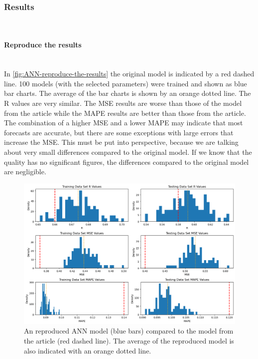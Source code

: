 \documentclass{article}
\newcommand{\subsubsubsection}[1]{%
  \paragraph{#1}\mbox{}\\}
\begin{document}
\subsubsection{Results}

\subsubsubsection{Reproduce the results}

In \autoref{fig:ANN-reproduce-the-results} the original model is indicated by a red dashed line. 100 models (with the selected parameters) were trained and shown as blue bar charts. The average of the bar charts is shown by an orange dotted line.
The R values are very similar. The MSE results are worse than those of the model from the article while the MAPE results are better than those from the article.
The combination of a higher MSE and a lower MAPE may indicate that most forecasts are accurate, but there are some exceptions with large errors that increase the MSE.
This must be put into perspective, because we are talking about very small differences compared to the original model. If we know that the quality has no significant figures, the differences compared to the original model are negligible.

\begin{figure}
	\centering
	\includegraphics[width=\linewidth]{figures/ANN_reproduce_the_results.png}
	\caption{An reproduced ANN model (blue bars) compared to the model from the article (red dashed line). The average of the reproduced model is also indicated with an orange dotted line.}
	\label{fig:ANN-reproduce-the-results}
\end{figure}
\end{document}
